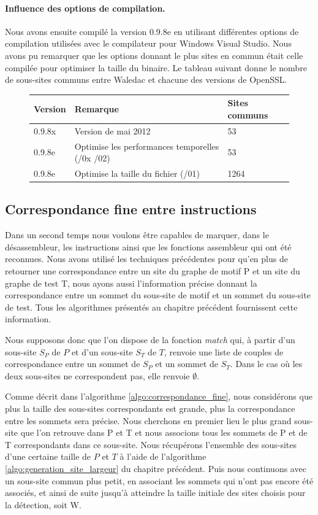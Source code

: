 \paragraph{Influence des options de compilation.}
Nous avons ensuite compilé la version 0.9.8e en utilisant différentes options de compilation utilisées avec le compilateur pour Windows Visual Studio.
Nous avons pu remarquer que les options donnant le plus sites en commun était celle compilée pour optimiser la taille du binaire. Le tableau suivant donne le nombre de sous-sites communs entre Waledac et chacune des versions de OpenSSL.

\begin{figure}[h]
\begin{tabular}{|l|l|l|}
 \hline
Version & Remarque & Sites communs \\
 \hline
0.9.8x & Version de mai 2012 & 53 \\
0.9.8e & Optimise les performances temporelles (/0x /02) & 53 \\
0.9.8e & Optimise la taille du fichier (/01) & 1264 \\
 \hline
\end{tabular}
\end{figure}

\subsection{Correspondance fine entre instructions}
Dans un second temps nous voulons être capables de marquer, dans le désassembleur, les instructions ainsi que les fonctions assembleur qui ont été reconnues.
Nous avons utilisé les techniques précédentes pour qu'en plus de retourner une correspondance entre un site du graphe de motif P et un site du graphe de test T, nous ayons aussi l'information précise donnant la correspondance entre un sommet du sous-site de motif et un sommet du sous-site de test. Tous les algorithmes présentés au chapitre précédent fournissent cette information.

Nous supposons donc que l'on dispose de la fonction \emph{match} qui, à partir d'un sous-site $S_P$ de $P$ et d'un sous-site $S_T$ de $T$, renvoie une liste de couples de correspondance entre un sommet de $S_P$ et un sommet de $S_T$. Dans le cas où les deux sous-sites ne correspondent pas, elle renvoie $\emptyset$.

Comme décrit dans l'algorithme \ref{algo:correspondance_fine}, nous considérons que plus la taille des sous-sites correspondants est grande, plus la correspondance entre les sommets sera précise.
Nous cherchons en premier lieu le plus grand sous-site que l'on retrouve dans P et T et nous associons tous les sommets de P et de T  correspondants dans ce sous-site. Nous récupérons l'ensemble des sous-sites d'une certaine taille de $P$ et $T$ à l'aide de l'algorithme \ref{algo:generation_site_largeur} du chapitre précédent.
Puis nous continuons avec un sous-site commun plus petit, en associant les sommets qui n'ont pas encore été associés, et ainsi de suite jusqu'à atteindre la taille initiale des sites choisis pour la détection, soit W. 

